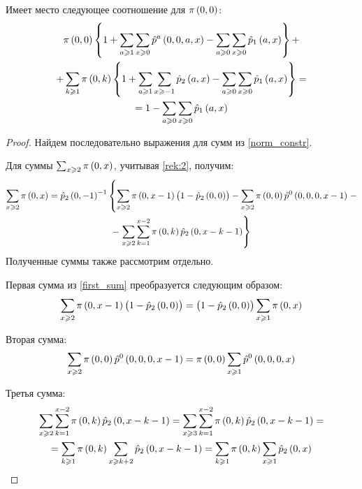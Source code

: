 \documentclass[a4paper,14pt,russian]{article}
\newcommand{\p}{\hat{p}}
\begin{document}
\begin{lemma}
 Имеет место следующее соотношение для $\pi\left(0,0\right)$:
\begin{multline}
  \pi\br{0,0}\brrr{1 + \sum_{a\geqslant 1}\sum_{x\geqslant 0}\p^a\br{0,0,a,x} - \sum_{a\geqslant 0}\sum_{x\geqslant 0} \p_1\br{a,x}} + \\ +
\sum_{k \geqslant 1} \pi\br{0,k} \brrr{1 + \sum_{a\geqslant 1}\sum_{x\geqslant -1}\p_2\br{a,x}  - \sum_{a\geqslant 0}\sum_{x\geqslant 0}\p_1\br{a,x} }
= \\= 1 -\sum_{a\geqslant 0}\sum_{x\geqslant 0}\p_1\br{a,x}
\label{final_eq}
\end{multline}
\end{lemma}
\begin{proof}
Найдем последовательно выражения для сумм из \eqref{norm_constr}.

Для суммы $\sum_{x \geqslant 2} \pi\left(0,x\right)$, учитывая \eqref{rek:2}, получим:
\begin{multline}
 \sum_{x \geqslant 2} \pi\br{0,x} = \p_2\br{0,-1}^{-1} \left\{\sum_{x \geqslant 2} \pi\br{0,x -1} \br{1 - \p_2\br{0,0}} -
\sum_{x \geqslant 2} \pi\br{0,0}\p^0\br{0,0,0,x-1} \right.-\\- \left.\sum_{x \geqslant 2}  \sum_{k=1}^{x-2}\pi\br{0,k}\p_2\br{0,x-k - 1}
\right\}
\label{first_sum}
\end{multline}
Полученные суммы также рассмотрим отдельно.

Первая сумма из \eqref{first_sum} преобразуется следующим образом:
\begin{equation}
 \sum_{x \geqslant 2} \pi\br{0,x -1} \br{1 - \p_2\br{0,0}} =  \br{1 - \p_2\br{0,0}} \sum_{x \geqslant 1} \pi\br{0,x}
 \label{temp:1:1}
\end{equation}

Вторая сумма:
\begin{equation}
 \sum_{x \geqslant 2} \pi\br{0,0}\p^0\br{0,0,0,x-1} =  \pi \br{0,0}\sum_{x \geqslant 1}\p^0\br{0,0,0,x} 
 \label{temp:1:2}
\end{equation}

Третья сумма:
\begin{multline}
  \sum_{x \geqslant 2} \sum_{k=1}^{x-2}\pi\br{0,k}\p_2\br{0,x-k - 1} = 
  \sum_{x \geqslant 3} \sum_{k=1}^{x-2}\pi\br{0,k}\p_2\br{0,x-k - 1} =\\ =
  \sum_{k \geqslant 1} \pi\br{0,k} \sum_{x \geqslant k+2} \p_2\br{0,x-k - 1} 
 = \sum_{k \geqslant 1} \pi\br{0,k} \sum_{x \geqslant 1} \p_2\br{0,x}  
 \label{temp:1:3}
\end{multline}	


\end{proof}
\end{document}
